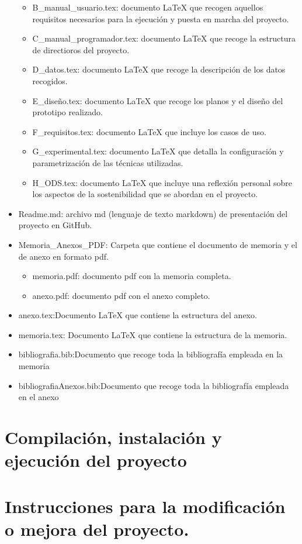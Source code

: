 \begin{itemize}
\begin{itemize}
        \item B\_manual\_usuario.tex: documento LaTeX que recogen aquellos requisitos necesarios para la ejecución y puesta en marcha del proyecto.
        \item C\_manual\_programador.tex: documento LaTeX que recoge la estructura de directioros del proyecto.
        \item D\_datos.tex: documento LaTeX que recoge la descripción de los datos recogidos.
        \item E\_diseño.tex: documento LaTeX que recoge los planos y el diseño del prototipo realizado.
        \item F\_requisitos.tex: documento LaTeX que incluye los casos de uso.
        \item G\_experimental.tex: documento LaTeX que detalla la configuración y parametrización de las técnicas utilizadas.
        \item H\_ODS.tex: documento LaTeX que incluye una reflexión personal sobre los aspectos de la sostenibilidad que se abordan en el proyecto.
    \end{itemize}
    \item Readme.md: archivo md (lenguaje de texto markdown) de presentación del proyecto en GitHub.
    \item Memoria\_Anexos\_PDF: Carpeta que contiene el documento de memoria y el de anexo en formato pdf.
    \begin{itemize}
        \item memoria.pdf: documento pdf con la memoria completa.
        \item anexo.pdf: documento pdf con el anexo completo.
    \end{itemize}
    \item anexo.tex:Documento LaTeX que contiene la estructura del anexo.
    \item memoria.tex: Documento LaTeX que contiene la estructura de la memoria.
    \item bibliografia.bib:Documento que recoge toda la bibliografía empleada en la memoria
    \item bibliografiaAnexos.bib:Documento que recoge toda la bibliografía empleada en el anexo
\end{itemize}
\section{Compilación, instalación y ejecución del proyecto}


\section{Instrucciones para la modificación o mejora del proyecto.}
